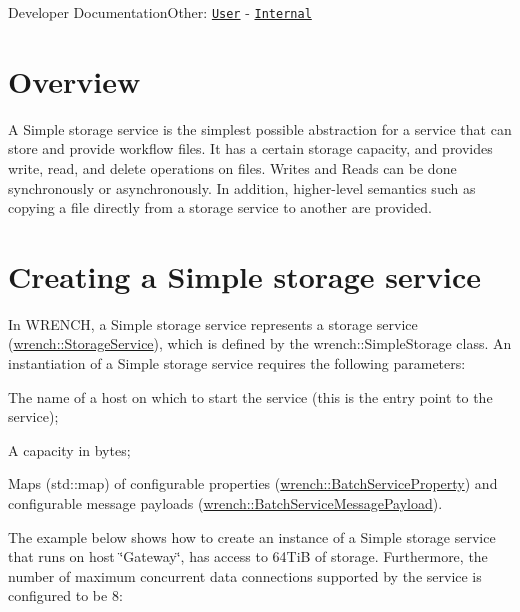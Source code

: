 Developer DocumentationOther\+: \href{../user/wrench-101.html}{\tt User} -\/ \href{../internal/wrench-101.html}{\tt Internal}\hypertarget{guide-simplestorage_guide-simplestorage-overview}{}\section{Overview}\label{guide-simplestorage_guide-simplestorage-overview}
A Simple storage service is the simplest possible abstraction for a service that can store and provide workflow files. It has a certain storage capacity, and provides write, read, and delete operations on files. Writes and Reads can be done synchronously or asynchronously. In addition, higher-\/level semantics such as copying a file directly from a storage service to another are provided.\hypertarget{guide-simplestorage_guide-simplestorage-creating}{}\section{Creating a Simple storage service}\label{guide-simplestorage_guide-simplestorage-creating}
In W\+R\+E\+N\+CH, a Simple storage service represents a storage service ({\ttfamily \hyperlink{classwrench_1_1_storage_service}{wrench\+::\+Storage\+Service}}), which is defined by the {\ttfamily wrench\+::\+Simple\+Storage} class. An instantiation of a Simple storage service requires the following parameters\+:


\begin{DoxyItemize}
\item The name of a host on which to start the service (this is the entry point to the service);
\item A capacity in bytes;
\item Maps ({\ttfamily std\+::map}) of configurable properties ({\ttfamily \hyperlink{classwrench_1_1_batch_service_property}{wrench\+::\+Batch\+Service\+Property}}) and configurable message payloads ({\ttfamily \hyperlink{classwrench_1_1_batch_service_message_payload}{wrench\+::\+Batch\+Service\+Message\+Payload}}).
\end{DoxyItemize}

The example below shows how to create an instance of a Simple storage service that runs on host \char`\"{}\+Gateway\char`\"{}, has access to 64\+TiB of storage. Furthermore, the number of maximum concurrent data connections supported by the service is configured to be 8\+:



